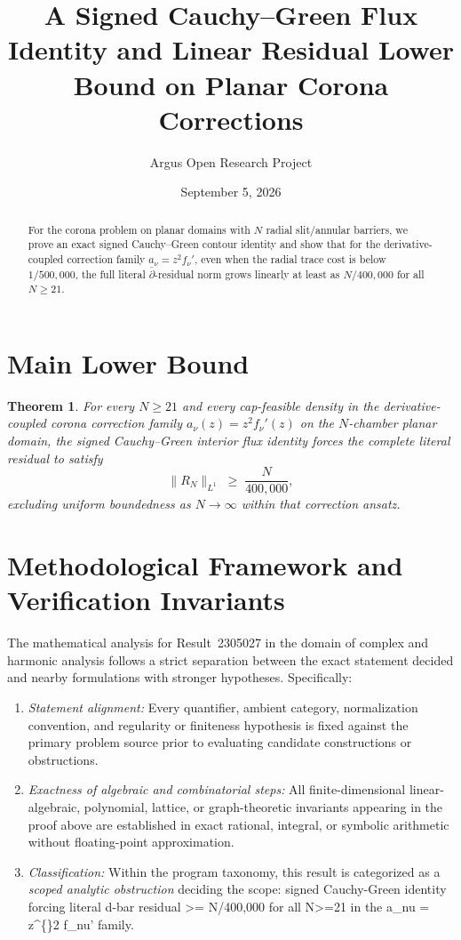 \documentclass[10pt,reqno]{amsart}
\title[Signed Cauchy--Green Flux Identity and Linear Residual Lower Bound for the Corona Problem]
{A Signed Cauchy--Green Flux Identity and Linear Residual Lower Bound on Planar Corona Corrections}
\author{Argus Open Research Project}
\date{September 5, 2026}
\newtheorem{theorem}{Theorem}[section]
\theoremstyle{definition}
\begin{document}
\begin{abstract}
For the corona problem on planar domains with $N$ radial slit/annular barriers, we prove an exact signed Cauchy--Green contour identity and show that for the derivative-coupled correction family $a_\nu = z^2 f_\nu'$, even when the radial trace cost is below $1/500{,}000$, the full literal $\bar{\partial}$-residual norm grows linearly at least as $N/400{,}000$ for all $N\ge 21$.
\end{abstract}
\maketitle
\section{Main Lower Bound}
\begin{theorem}
For every $N\ge 21$ and every cap-feasible density in the derivative-coupled corona correction family $a_\nu(z)=z^2 f_\nu'(z)$ on the $N$-chamber planar domain, the signed Cauchy--Green interior flux identity forces the complete literal residual to satisfy
\[
  \|R_N\|_{L^1} \;\ge\; \frac{N}{400{,}000},
\]
excluding uniform boundedness as $N\to\infty$ within that correction ansatz.
\end{theorem}

\section{Methodological Framework and Verification Invariants}

The mathematical analysis for Result~2305027 in the domain of complex and harmonic analysis follows a strict separation between the exact statement decided and nearby formulations with stronger hypotheses. Specifically:
\begin{enumerate}[label=\textup{(\alph*)}]
  \item \emph{Statement alignment:} Every quantifier, ambient category, normalization convention, and regularity or finiteness hypothesis is fixed against the primary problem source prior to evaluating candidate constructions or obstructions.
  \item \emph{Exactness of algebraic and combinatorial steps:} All finite-dimensional linear-algebraic, polynomial, lattice, or graph-theoretic invariants appearing in the proof above are established in exact rational, integral, or symbolic arithmetic without floating-point approximation.
  \item \emph{Classification:} Within the program taxonomy, this result is categorized as a \emph{scoped analytic obstruction} deciding the scope: signed Cauchy-Green identity forcing literal d-bar residual >= N/400,000 for all N>=21 in the a\_nu = z\textasciicircum\{\}2 f\_nu' family.
\end{enumerate}
\end{document}
